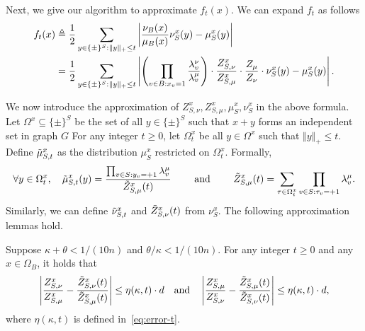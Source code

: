 Next, we give our algorithm to approximate $f_t(x)$. We can expand $f_t$ as follows 
\begin{align}\label{eq:exp-ft}
f_t(x) &\triangleq \frac{1}{2}\sum_{y \in \{\pm\}^S: \Vert y\Vert_+\leq t} \left|\frac{\nu_B(x)}{\mu_B(x)}  \nu_S^x(y)-\mu_S^x(y)\right|\notag\\
 &= \frac{1}{2}\sum_{y \in \{\pm\}^S: \Vert y\Vert_+\leq t} \left| {\left(\prod_{v\in B:x_v=1} \frac{\lambda_v^\nu}{\lambda_v^\mu} \right)} \cdot {\frac{Z_{S,\nu}^x}{Z_{S,\mu}^x}}\cdot {\frac{Z_\mu}{Z_\nu}} \cdot \nu_S^x(y)-\mu_S^x(y)\right|.
\end{align}

We now introduce the approximation of $Z_{S,\nu}^x,Z_{S,\mu}^x,\mu^x_S,\nu^x_S$ in the above formula. 
Let $\Omega^x \subseteq \{\pm\}^S$ be the set of all $y \in \{\pm\}^S$ such that $x + y$ forms an independent set in graph $G$
For any integer $t \geq 0$, let $\Omega_t^x$ be  all $y \in \Omega^x$ such that $\Vert y \Vert_+ \leq t$.
Define $\tilde{\mu}_{S,t}^x$ as the distribution $\mu_S^x$ restricted on $\Omega^x_t$. Formally,
\begin{align}\label{def:zx}
\forall y \in \Omega_{t}^x, \quad \tilde{\mu}_{S,t}^x(y) = \frac{\prod_{v \in S: y_v = +1}\lambda^\mu_v}{\tilde{Z}_{S,\mu}^x (t)} \qquad\text{ and }\qquad \tilde{Z}_{S,\mu}^x (t)=\sum_{\tau \in \Omega^x_{t}} \prod_{v \in S: \tau_v = +1}\lambda^\mu_v.
\end{align}
Similarly, we can define $\tilde{\nu}_{S,t}^x$ and $\tilde{Z}_{S,\nu}^x (t)$ from $\nu_S^x$. The following approximation lemmas hold.
\begin{lemma}\label{lem:appZ}
Suppose $\kappa + \theta < 1/(10n)$ and $\theta/\kappa < 1 / (10n)$.
For any integer $t \geq 0$ and any $x \in \Omega_B$, it holds that
\begin{align*}
    \left\vert \frac{Z_{S,\nu}^x}{Z_{S,\mu}^x} - \frac{\tilde{Z}_{S,\nu}^x (t)}{\tilde{Z}_{S,\mu}^x (t)} \right\vert \leq \eta(\kappa,t)\cdot d \quad \text{and} \quad \left\vert \frac{Z_{S,\mu}^x}{Z_{S,\nu}^x} - \frac{\tilde{Z}_{S,\mu}^x (t)}{\tilde{Z}_{S,\nu}^x (t)} \right\vert \leq \eta(\kappa,t) \cdot d,
\end{align*}
where $\eta(\kappa,t)$ is defined in~\eqref{eq:error-t}.
\end{lemma}
